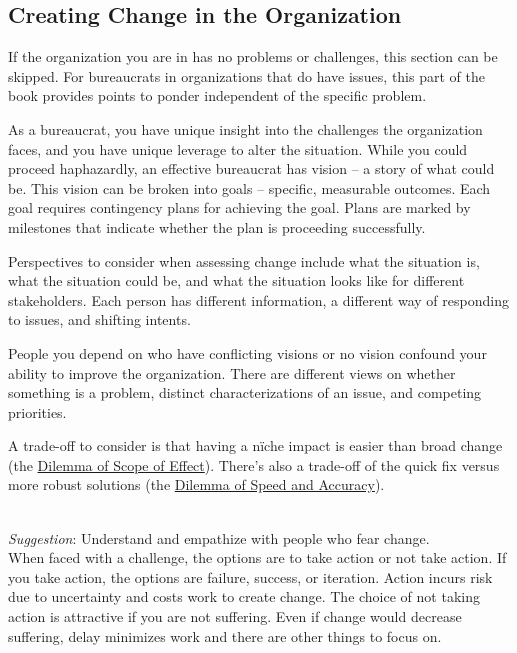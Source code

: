\subsection*{Creating Change in the Organization\label{sec:creating-change}}

If the organization you are in has no problems or challenges, this section can be skipped. For bureaucrats in organizations that do have issues, this part of the book provides points to ponder independent of the specific problem.

As a bureaucrat, you have unique insight into the challenges the organization faces, and you have unique leverage to alter the situation.  While you could proceed haphazardly, an effective bureaucrat has vision -- a story of what could be. This vision can be broken into goals -- specific, measurable outcomes. Each goal requires contingency plans for achieving the goal. Plans are marked by milestones that indicate whether the plan is proceeding successfully. 

Perspectives to consider when assessing change include what the situation is, what the situation could be, and what the situation looks like for different stakeholders. Each person has different information, a different way of responding to issues, and shifting intents.

People you depend on who have conflicting visions or no vision confound your ability to improve the organization. There are different views on whether something is a problem, distinct characterizations of an issue, and competing priorities.

A trade-off to consider is that having a n\"iche impact is easier than broad change (the \hyperref[table:dilemma-personal-scope-broad-vs-narrow]{Dilemma of Scope of Effect}). 
%
There's also a trade-off of the quick fix versus more robust solutions (the \hyperref[table:dilemma-personal-quick-methodical]{Dilemma of Speed and Accuracy}).




\ \\
\textit{Suggestion}: Understand and empathize with people who fear change. \\
When faced with a challenge, the options are to take action or not take action. If you take action, the options are failure, success, or iteration. Action incurs risk due to uncertainty and costs work to create change.
The choice of not taking action is attractive if you are not suffering. Even if change would decrease suffering, delay minimizes work and there are other things to focus on.


